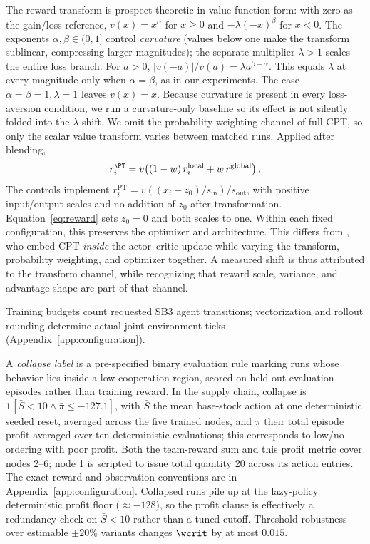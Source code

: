 The reward transform is prospect-theoretic in value-function form: with zero as the gain/loss
reference, $v(x)=x^\alpha$ for $x\ge0$ and $-\lambda(-x)^\beta$ for $x<0$. The exponents
$\alpha,\beta\in(0,\allowbreak 1]$ control \emph{curvature} (values below one make the transform sublinear, compressing
larger magnitudes); the separate multiplier $\lambda>1$ scales the entire loss branch. For $a>0$, $|v(-a)|/v(a)=\lambda a^{\beta-\alpha}$. This equals $\lambda$ at every magnitude only when $\alpha=\beta$, as in our experiments. The case $\alpha{=}\beta{=}1,\lambda{=}1$ leaves $v(x)=x$.
Because curvature is present in every loss-\allowbreak aversion condition, we run a curvature-only baseline so its
effect is not silently folded into the $\lambda$ shift. We omit the probability-weighting channel of
full CPT, so only the scalar value transform varies between matched runs. Applied after blending,
\begin{equation}
 r_i^{\PT}=v\!\left((1-w)\,r_i^{\mathrm{local}}+w\,r^{\mathrm{global}}\right),
 \label{eq:reward}
\end{equation}
The controls implement $r_i^{\mathrm{PT}}=v((x_i-z_0)/s_{\mathrm{in}})/s_{\mathrm{out}}$, with positive input/output scales and no addition of $z_0$ after transformation. Equation~\ref{eq:reward} sets $z_0=0$ and both scales to one. Within each fixed configuration, this preserves the optimizer and architecture. This differs
from \citet{lalmohammed2025}, who embed CPT \emph{inside} the actor--critic update while varying the transform,
probability weighting, and optimizer together. A measured shift is thus attributed to the transform
channel, while recognizing that reward scale, variance, and advantage shape are part of that channel.

Training budgets count requested SB3 agent transitions; vectorization and rollout
rounding determine actual joint environment ticks (Appendix~\ref{app:configuration}).

A \emph{collapse label} is a pre-specified binary evaluation rule marking runs whose behavior lies
inside a low-cooperation region, scored on held-out evaluation episodes rather than training reward.
In the supply chain, collapse is $\mathbf{1}[\bar S<10\wedge\bar\pi\le-127.1]$, with $\bar S$ the
mean base-stock action at one deterministic seeded reset, averaged across the five trained
nodes, and $\bar\pi$ their total episode profit averaged over ten deterministic evaluations; this corresponds to
low/no ordering with poor profit. Both the team-reward sum and this profit metric cover
nodes 2--6; node 1 is scripted to issue total quantity 20 across its action entries.
The exact reward and observation conventions are in Appendix~\ref{app:configuration}. Collapsed runs pile up at the lazy-policy deterministic
profit floor ($\approx-128$), so the profit clause is effectively a redundancy check on
$\bar S<10$ rather than a tuned cutoff. Threshold robustness over estimable $\pm20\%$
variants changes $\wcrit$ by at most $0.015$.

